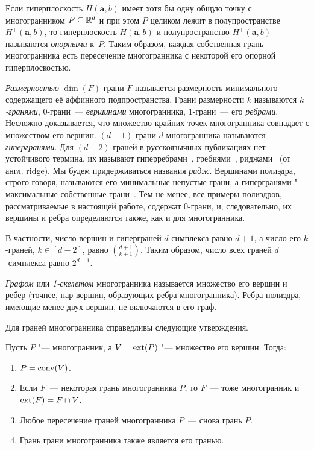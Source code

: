 Если гиперплоскость $H(\bm{a},b)$ имеет хотя бы одну общую точку с многогранником $P \subseteq \mathbb{R}^d$ 
и при этом $P$ целиком лежит в полупространстве $H^+(\bm{a},b)$, то гиперплоскость $H(\bm{a},b)$ и полупространство $H^+(\bm{a},b)$ называются \emph{опорными} к~$P$.
Таким образом, каждая собственная грань многогранника есть пересечение многогранника с некоторой его опорной гиперплоскостью.

\emph{Размерностью} $\dim(F)$ грани $F$ называется размерность минимального содержащего её аффинного подпространства.
Грани размерности $k$ называются \emph{$k$-гранями}, 0-грани~--- \emph{вершинами} многогранника, 1-грани~--- его \emph{ребрами}.
Несложно доказывается, что множество крайних точек многогранника совпадает с множеством его вершин.
$(d-1)$-грани $d$-многогранника называются \emph{гипергранями}. 
Для $(d-2)$-граней в русскоязычных публикациях нет устойчивого термина, 
их называют гиперребрами~\cite{ZieglerBook}, гребнями~\cite{Bastrakov:2011}, риджами~\cite{Deza:2001} (от англ. ridge).
Мы будем придерживаться названия \emph{ридж}.
Вершинами полиэдра\label{def:PolyVertex}, строго говоря, называются его минимальные непустые грани, а гипергранями "--- максимальные собственные грани~\cite[с.~79]{ZieglerBook}.
Тем не менее, все примеры полиэдров, рассматриваемые в настоящей работе, содержат 0-грани, и, следовательно, их вершины и ребра определяются также, как и для многогранника.

В частности, число вершин и гиперграней $d$-симплекса равно $d+1$, а число его $k$-граней, $k \in [d-2]$, равно $\binom{d+1}{k+1}$. 
Таким образом, число всех граней $d$-симплекса равно $2^{d+1}$.

\emph{Графом} или \emph{1-скелетом} многогранника называется множество его вершин и ребер (точнее, пар вершин, образующих ребра многогранника).
Ребра полиэдра, имеющие менее двух вершин, не включаются в его граф.

Для граней многогранника справедливы следующие утверждения.

\begin{prop}
	Пусть $P$ "--- многогранник, а $V = \operatorname{ext}(P)$ "---  множество его вершин. Тогда:
	\begin{enumerate}
		\item $P = \operatorname{conv}(V)$. %
		\item Если $F$~--- некоторая грань многогранника $P$, то $F$~--- тоже многогранник и $\operatorname{ext}(F) = F \cap V$.
		\item Любое пересечение граней многогранника $P$~--- снова грань $P$.
		\item Грань грани многогранника также является его гранью.
	\end{enumerate}	
\end{prop}

